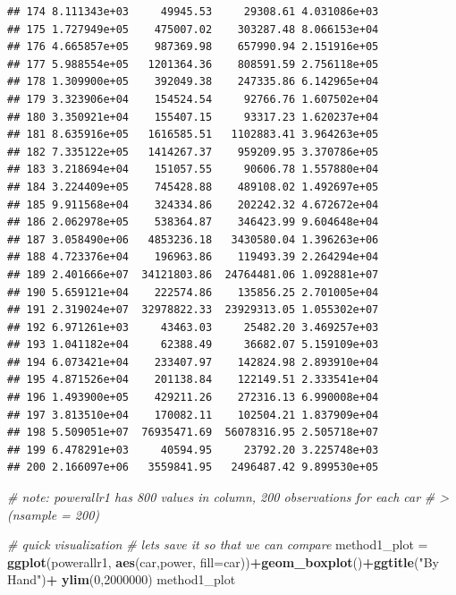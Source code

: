 \documentclass[
]{article}
\newenvironment{Shaded}{\begin{snugshade}}{\end{snugshade}}
\newcommand{\AttributeTok}[1]{\textcolor[rgb]{0.13,0.29,0.53}{#1}}
\newcommand{\CommentTok}[1]{\textcolor[rgb]{0.56,0.35,0.01}{\textit{#1}}}
\newcommand{\DecValTok}[1]{\textcolor[rgb]{0.00,0.00,0.81}{#1}}
\newcommand{\FunctionTok}[1]{\textcolor[rgb]{0.13,0.29,0.53}{\textbf{#1}}}
\newcommand{\NormalTok}[1]{#1}
\newcommand{\OtherTok}[1]{\textcolor[rgb]{0.56,0.35,0.01}{#1}}
\newcommand{\SpecialCharTok}[1]{\textcolor[rgb]{0.81,0.36,0.00}{\textbf{#1}}}
\newcommand{\StringTok}[1]{\textcolor[rgb]{0.31,0.60,0.02}{#1}}
\begin{document}
\begin{verbatim}
## 174 8.111343e+03     49945.53     29308.61 4.031086e+03
## 175 1.727949e+05    475007.02    303287.48 8.066153e+04
## 176 4.665857e+05    987369.98    657990.94 2.151916e+05
## 177 5.988554e+05   1201364.36    808591.59 2.756118e+05
## 178 1.309900e+05    392049.38    247335.86 6.142965e+04
## 179 3.323906e+04    154524.54     92766.76 1.607502e+04
## 180 3.350921e+04    155407.15     93317.23 1.620237e+04
## 181 8.635916e+05   1616585.51   1102883.41 3.964263e+05
## 182 7.335122e+05   1414267.37    959209.95 3.370786e+05
## 183 3.218694e+04    151057.55     90606.78 1.557880e+04
## 184 3.224409e+05    745428.88    489108.02 1.492697e+05
## 185 9.911568e+04    324334.86    202242.32 4.672672e+04
## 186 2.062978e+05    538364.87    346423.99 9.604648e+04
## 187 3.058490e+06   4853236.18   3430580.04 1.396263e+06
## 188 4.723376e+04    196963.86    119493.39 2.264294e+04
## 189 2.401666e+07  34121803.86  24764481.06 1.092881e+07
## 190 5.659121e+04    222574.86    135856.25 2.701005e+04
## 191 2.319024e+07  32978822.33  23929313.05 1.055302e+07
## 192 6.971261e+03     43463.03     25482.20 3.469257e+03
## 193 1.041182e+04     62388.49     36682.07 5.159109e+03
## 194 6.073421e+04    233407.97    142824.98 2.893910e+04
## 195 4.871526e+04    201138.84    122149.51 2.333541e+04
## 196 1.493900e+05    429211.26    272316.13 6.990008e+04
## 197 3.813510e+04    170082.11    102504.21 1.837909e+04
## 198 5.509051e+07  76935471.69  56078316.95 2.505718e+07
## 199 6.478291e+03     40594.95     23792.20 3.225748e+03
## 200 2.166097e+06   3559841.95   2496487.42 9.899530e+05
\end{verbatim}

\begin{Shaded}
\begin{Highlighting}[]
\CommentTok{\# note: powerallr1 has 800 values in column, 200 observations for each car }
\CommentTok{\# \textgreater{} (nsample = 200)}


\CommentTok{\# quick visualization}
\CommentTok{\# lets save it so that we can compare}
\NormalTok{method1\_plot }\OtherTok{=} \FunctionTok{ggplot}\NormalTok{(powerallr1, }\FunctionTok{aes}\NormalTok{(car,power, }\AttributeTok{fill=}\NormalTok{car))}\SpecialCharTok{+}\FunctionTok{geom\_boxplot}\NormalTok{()}\SpecialCharTok{+}\FunctionTok{ggtitle}\NormalTok{(}\StringTok{"By Hand"}\NormalTok{)}\SpecialCharTok{+}
  \FunctionTok{ylim}\NormalTok{(}\DecValTok{0}\NormalTok{,}\DecValTok{2000000}\NormalTok{)}
\NormalTok{method1\_plot}
\end{Highlighting}
\end{Shaded}
\end{document}
